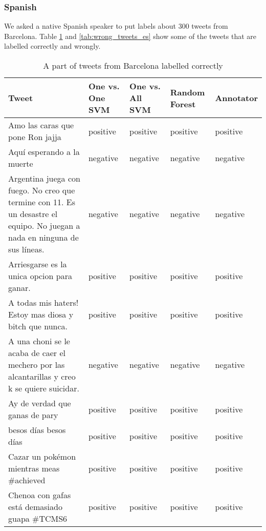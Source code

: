 \subsubsection{Spanish}
We asked a native Spanish speaker to put labels about 300 tweets from Barcelona.
Table \ref{tab:correct_tweets_es} and \ref{tab:wrong_tweets_es}  show some of the tweets that are labelled correctly and wrongly.
\begin{table}[ht]
	\caption{A part of tweets from Barcelona labelled correctly}
	\begin{tabular}{|p{5cm}|p{1.8cm}|p{1.8cm}|p{1.8cm}|p{1.8cm}|} \hline
	Tweet & One vs. One SVM &One vs. All SVM &Random Forest & Annotator\\ \hline

	Amo las caras que pone Ron jajja&positive&positive&positive&positive \\ \hline
	Aqu\'i esperando a la muerte&negative &negative &negative &negative \\ \hline
	Argentina juega con fuego. No creo que termine con 11. Es un desastre el equipo. No juegan a nada en ninguna de sus l\'ineas. &negative&negative&negative&negative\\ \hline
	Arriesgarse es la unica opcion para ganar.&positive&positive&positive&positive\\ \hline
	A todas mis haters! Estoy mas diosa y bitch que nunca.&positive&positive&positive&positive\\ \hline

	A una choni se le acaba de caer el mechero por las alcantarillas y creo k se quiere suicidar.&negative&negative&negative&negative\\ \hline
	Ay de verdad que ganas de pary&positive&positive&positive&positive\\ \hline
	besos días besos d\'ias&positive&positive&positive&positive\\ \hline
	Cazar un pok\'emon mientras meas \#achieved&positive&positive&positive&positive\\ \hline
	Chenoa con gafas est\'a demasiado guapa \#TCMS6&positive&positive&positive&positive\\ \hline

	\end{tabular}
	\label{tab:correct_tweets_es}
\end{table}


